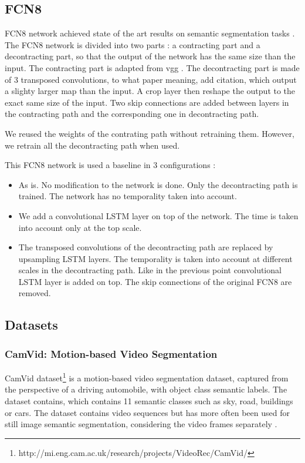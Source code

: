 \subsection{FCN8}
FCN8 network achieved state of the art results on semantic segmentation tasks
\cite{DBLP:conf/cvpr/LongSD15}. The FCN8 network is divided into two parts : a
contracting part and a decontracting part, so that the output of the network
has the same size than the input. The contracting part is adapted from vgg
\cite{Simonyan14vgg}. The decontracting part is made of 3 transposed
convolutions, to what paper meaning, add citation, which output a slighty
larger map than the input. A crop layer then reshape the output to the exact
same size of the input. Two skip connections are added between layers in the
contracting path and the corresponding one in decontracting path.

We reused the weights of the contrating path without retraining them. However,
we retrain all the decontracting path when used.

This FCN8 network is used a baseline in 3 configurations :
\begin{itemize}
    \item As is. No modification to the network is done. Only the decontracting
        path is trained. The network has no temporality taken into account.
    \item We add a convolutional LSTM layer on top of the network. The time is
        taken into account only at the top scale.
    \item The transposed convolutions of the decontracting path are replaced by
        upsampling LSTM layers. The temporality is taken into account at
        different scales in the decontracting path. Like in the previous point
        convolutional LSTM layer is added on top. The skip connections of the
        original FCN8 are removed.
\end{itemize}


\subsection{Datasets}

\subsubsection{CamVid: Motion-based Video Segmentation}
\label{sssec:camvid}
CamVid
dataset\footnote{http://mi.eng.cam.ac.uk/research/projects/VideoRec/CamVid/}
\cite{Brostow90camvid} is a motion-based video segmentation dataset, captured
from the perspective of a driving automobile, with object class semantic
labels. The dataset contains, which contains 11 semantic classes such as sky,
road, buildings or cars. The dataset contains video sequences but has more
often been used for still image semantic segmentation, considering the video
frames separately \cite{}.

